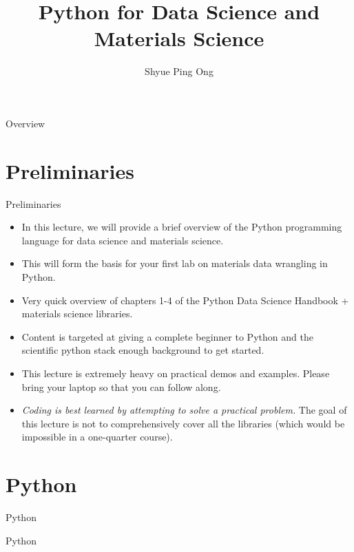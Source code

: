 \documentclass[aspectratio=169]{beamer}
\title[Python for Data Science and Materials Science]{Python for Data Science and Materials Science}
\author{Shyue Ping Ong}
\institute[UCSD]{University of California, San Diego\\
\medskip
}
\date{\classyear} %
\begin{document}
\begin{frame}
    \titlepage %
\end{frame}


\begin{frame}{Overview}
    \tableofcontents
\end{frame}


\section{Preliminaries}

\begin{frame}{Preliminaries}
    \begin{itemize}
        \item In this lecture, we will provide a brief overview of the Python programming language for data science and materials science.
        \item This will form the basis for your first lab on materials data wrangling in Python.
        \item Very quick overview of chapters 1-4 of the Python Data Science Handbook\cite{vanderplasPythonDataScience2016} + materials science libraries.
        \item Content is targeted at giving a complete beginner to Python and the scientific python stack enough background to get started.
        \item This lecture is extremely heavy on practical demos and examples. Please bring your laptop so that you can follow along.
        \item \textit{Coding is best learned by attempting to solve a practical problem.} The goal of this lecture is not to comprehensively cover all the libraries (which would be impossible in a one-quarter course).
    \end{itemize}
\end{frame}


\section{Python}

\begin{frame}{Python}
    \Huge{\centerline{Python}}
\end{frame} 
\end{document}

